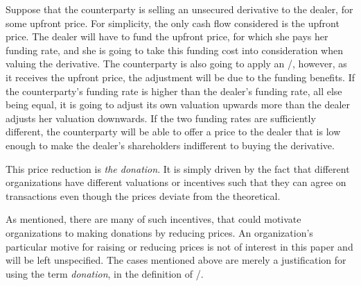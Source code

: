 \documentclass[main.tex]{subfiles}
\begin{document}
        \begin{example}
        Suppose that the counterparty is selling an unsecured derivative to the dealer, 
        for some upfront price. 
        For simplicity, the only cash flow considered is the upfront price.
        The dealer will have to fund the upfront price, for which she pays her funding rate,
        and she is going to take this funding cost into consideration when valuing the derivative.
        The counterparty is also going to apply an \FVA/, however, as it receives the upfront price,
        the adjustment will be due to the funding benefits.
        If the counterparty's funding rate is higher than the dealer's funding rate,
        all else being equal, it is going to adjust its own valuation upwards more 
        than the dealer adjusts her valuation downwards. 
        If the two funding rates are sufficiently different, 
        the counterparty will be able to offer a price to the dealer
        that is low enough to make the dealer's shareholders indifferent to buying the derivative.

        This price reduction is \textit{the donation}.
        It is simply driven by the fact that different organizations 
        have different valuations or incentives such that they can agree on transactions
        even though the prices deviate from the theoretical.
        \end{example}

        As mentioned, there are many of such incentives, 
        that could motivate organizations to making donations by reducing prices. 
        An organization's particular motive for raising or reducing prices
        is not of interest in this paper and will be left unspecified.
        The cases mentioned above are merely a justification for using the term \textit{donation},
        in the definition of \FVA/.
\end{document}
